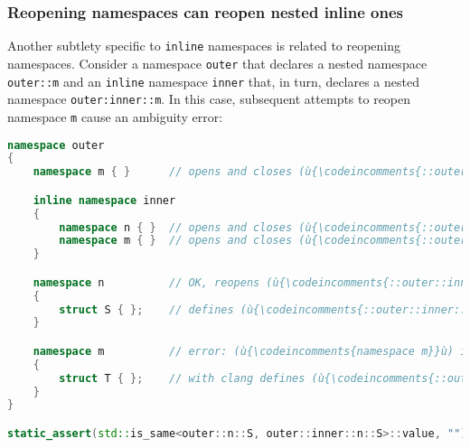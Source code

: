 \subsubsection[Reopening namespaces can reopen nested {\tt inline} ones]{Reopening namespaces can reopen nested {\SubsubsecCode inline} ones}\label{reopening-namespaces-can-reopen-nested-inline-ones}

Another subtlety specific to \texttt{inline} namespaces is related to
reopening namespaces. Consider a namespace \texttt{outer} that declares
a nested namespace \texttt{outer::m} and an \texttt{inline}
namespace \texttt{inner} that, in turn, declares a nested namespace
\texttt{outer:inner::m}. In this case, subsequent attempts to reopen
namespace \texttt{m} cause an ambiguity error:

\begin{lstlisting}[language=C++]
namespace outer
{
    namespace m { }      // opens and closes (ù{\codeincomments{::outer::m}}ù)

    inline namespace inner
    {
        namespace n { }  // opens and closes (ù{\codeincomments{::outer::inner::n}}ù)
        namespace m { }  // opens and closes (ù{\codeincomments{::outer::inner::m}}ù)
    }

    namespace n          // OK, reopens (ù{\codeincomments{::outer::inner::n}}ù)
    {
        struct S { };    // defines (ù{\codeincomments{::outer::inner::n::S}}ù)
    }

    namespace m          // error: (ù{\codeincomments{namespace m}}ù) is ambiguous
    {
        struct T { };    // with clang defines (ù{\codeincomments{::outer::m::T}}ù)
    }
}

static_assert(std::is_same<outer::n::S, outer::inner::n::S>::value, "");
\end{lstlisting}
    
